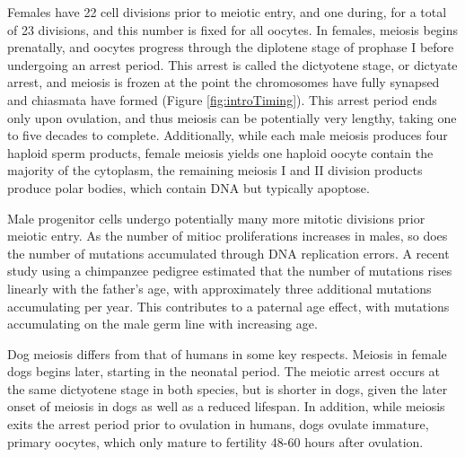 Females have 22 cell divisions prior to meiotic entry, and one during, for a total of 23 divisions\cite{Crow2000a}, and this number is fixed for all oocytes.
In females, meiosis begins prenatally, and oocytes progress through the diplotene stage of prophase I before undergoing an arrest period\cite{Hassold2001,Crow2000a}.
This arrest is called the dictyotene stage, or dictyate arrest, and meiosis is frozen at the point the chromosomes have fully synapsed and chiasmata have formed (Figure \ref{fig:introTiming}).
This arrest period ends only upon ovulation, and thus meiosis can be potentially very lengthy, taking one to five decades to complete.
Additionally, while each male meiosis produces four haploid sperm products, female meiosis yields one haploid oocyte contain the majority of the cytoplasm, the remaining meiosis I and II division products produce polar bodies, which contain DNA but typically apoptose\cite{Schmerler2011}.

Male progenitor cells undergo potentially many more mitotic divisions prior meiotic entry.
As the number of mitioc proliferations increases in males, so does the number of mutations accumulated through DNA replication errors.
A recent study using a chimpanzee pedigree estimated that the number of mutations rises linearly with the father's age, with approximately three additional mutations accumulating per year\cite{Venn2014}.
This contributes to a paternal age effect, with mutations accumulating on the male germ line with increasing age.

Dog meiosis differs from that of humans in some key respects.
Meiosis in female dogs begins later, starting in the neonatal period\cite{Freixa1987}.
The meiotic arrest occurs at the same dictyotene stage in both species, but is shorter in dogs, given the later onset of meiosis in dogs as well as a reduced lifespan.
In addition, while meiosis exits the arrest period prior to ovulation in humans, dogs ovulate immature, primary oocytes, which only mature to fertility 48-60 hours after ovulation\cite{Tsutsui1989,Chastant-Maillard2011}.


